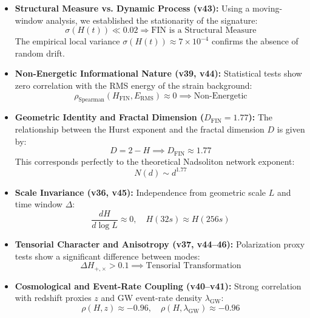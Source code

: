 \documentclass[11pt,a4paper]{book}
\theoremstyle{remark}
\begin{document}
\begin{itemize}
    \item \textbf{Structural Measure vs. Dynamic Process (v43):} Using a moving-window analysis, we established the stationarity of the signature:
    \begin{equation}
    \sigma(H(t)) \ll 0.02 \Rightarrow \text{FIN is a Structural Measure}
    \end{equation}
    The empirical local variance $\sigma(H(t)) \approx 7 \times 10^{-4}$ confirms the absence of random drift.
    \item \textbf{Non-Energetic Informational Nature (v39, v44):} Statistical tests show zero correlation with the RMS energy of the strain background:
    \begin{equation}
    \rho_{\text{Spearman}}(H_{\text{FIN}}, E_{\text{RMS}}) \approx 0 \implies \text{Non-Energetic}
    \end{equation}

    \item \textbf{Geometric Identity and Fractal Dimension ($D_{\text{FIN}} = 1.77$):} The relationship between the Hurst exponent and the fractal dimension $D$ is given by:
    \begin{equation}
    D = 2 - H \implies D_{\text{FIN}} \approx 1.77
    \end{equation}
    This corresponds perfectly to the theoretical Nadsoliton network exponent:
    \begin{equation}
    N(d) \sim d^{1.77}
    \end{equation}

    \item \textbf{Scale Invariance (v36, v45):} Independence from geometric scale $L$ and time window $\Delta$:
    \begin{equation}
    \frac{dH}{d\log L} \approx 0, \quad H(32s) \approx H(256s)
    \end{equation}
    \item \textbf{Tensorial Character and Anisotropy (v37, v44--46):} Polarization proxy tests show a significant difference between modes:
    \begin{equation}
    \Delta H_{+,\times} > 0.1 \implies \text{Tensorial Transformation}
    \end{equation}

    \item \textbf{Cosmological and Event-Rate Coupling (v40--v41):} Strong correlation with redshift proxies $z$ and GW event-rate density $\lambda_{\text{GW}}$:
    \begin{equation}
    \rho(H,z) \approx -0.96, \quad \rho(H, \lambda_{\text{GW}}) \approx -0.96
    \end{equation}
\end{itemize}
\end{document}
